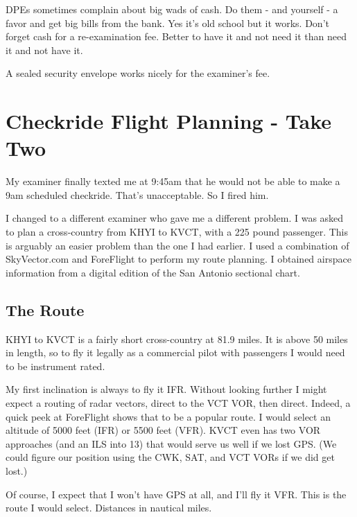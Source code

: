 DPEs sometimes complain about big wads of cash. Do them - and yourself - a favor and get big bills from the bank. Yes it's old school but it works. Don't forget cash for a re-examination fee. Better to have it and not need it than need it and not have it.

A sealed security envelope works nicely for the examiner's fee.

\section{Checkride Flight Planning - Take Two}

My examiner finally texted me at 9:45am that he would not be able to make a 9am scheduled checkride. That's unacceptable. So I fired him.

I changed to a different examiner who gave me a different problem. I was asked to plan a cross-country from KHYI to KVCT, with a 225 pound passenger. This is arguably an easier problem than the one I had earlier. I used a combination of SkyVector.com and ForeFlight to perform my route planning. I obtained airspace information from a digital edition of the San Antonio sectional chart.

\subsection{The Route}

KHYI to KVCT is a fairly short cross-country at 81.9 miles. It is above 50 miles in length, so to fly it legally as a commercial pilot with passengers I would need to be instrument rated.

My first inclination is always to fly it IFR. Without looking further I might expect a routing of radar vectors, direct to the VCT VOR, then direct. Indeed, a quick peek at ForeFlight shows that to be a popular route. I would select an altitude of 5000 feet (IFR) or 5500 feet (VFR). KVCT even has two VOR approaches (and an ILS into 13) that would serve us well if we lost GPS. (We could figure our position using the CWK, SAT, and VCT VORs if we did get lost.)

Of course, I expect that I won't have GPS at all, and I'll fly it VFR. This is the route I would select. Distances in nautical miles.


